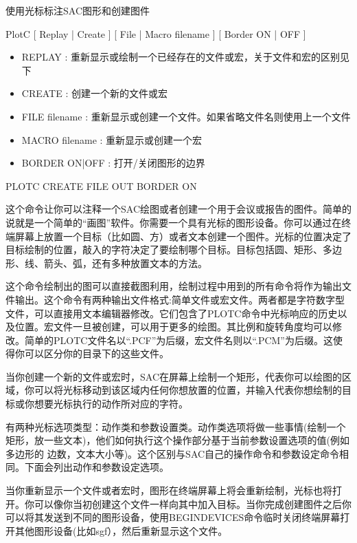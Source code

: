 \label{cmd:plotc}

使用光标标注SAC图形和创建图件

PlotC [ Replay | Create ] [ File | Macro filename ] [ Border ON | OFF ] 

\begin{itemize}
\item REPLAY : 重新显示或绘制一个已经存在的文件或宏，关于文件和宏的区别见下 
\item CREATE : 创建一个新的文件或宏 
\item FILE filename : 重新显示或创建一个文件。如果省略文件名则使用上一个文件
\item MACRO filename : 重新显示或创建一个宏 
\item BORDER ON|OFF : 打开/关闭图形的边界 
\end{itemize}

PLOTC CREATE FILE OUT BORDER ON

这个命令让你可以注释一个SAC绘图或者创建一个用于会议或报告的图件。简单的说就是一个简单的``画图''软件。你需要一个具有光标的图形设备。你可以通过在终端屏幕上放置一个目标（比如圆、方）或者文本创建一个图件。光标的位置决定了目标绘制的位置，敲入的字符决定了要绘制哪个目标。目标包括圆、矩形、多边形、线、箭头、弧，还有多种放置文本的方法。

这个命令绘制出的图可以直接截图利用，绘制过程中用到的所有命令将作为输出文件输出。这个命令有两种输出文件格式:简单文件或宏文件。两者都是字符数字型文件，可以直接用文本编辑器修改。它们包含了PLOTC命令中光标响应的历史以及位置。宏文件一旦被创建，可以用于更多的绘图。其比例和旋转角度均可以修改。简单的PLOTC文件名以``.PCF''为后缀，宏文件名则以``.PCM''为后缀。这使得你可以区分你的目录下的这些文件。

当你创建一个新的文件或宏时，SAC在屏幕上绘制一个矩形，代表你可以绘图的区域，你可以将光标移动到该区域内任何你想放置的位置，并输入代表你想绘制的目标或你想要光标执行的动作所对应的字符。

有两种光标选项类型：动作类和参数设置类。动作类选项将做一些事情(绘制一个矩形，放一些文本)，他们如何执行这个操作部分基于当前参数设置选项的值(例如多边形的	边数，文本大小等)。这个区别与SAC自己的操作命令和参数设定命令相同。下面会列出动作和参数设定选项。

当你重新显示一个文件或者宏时，图形在终端屏幕上将会重新绘制，光标也将打开。你可以像你当初创建这个文件一样向其中加入目标。当你完成创建图件之后你可以将其发送到不同的图形设备，使用BEGINDEVICES命令临时关闭终端屏幕打开其他图形设备(比如sgf），然后重新显示这个文件。

